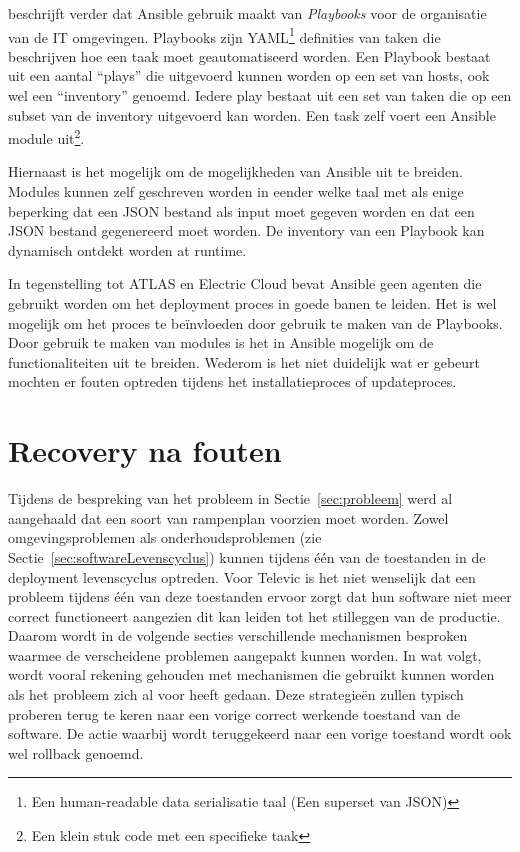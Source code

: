 \citep{ansible} beschrijft verder dat Ansible gebruik maakt van \emph{Playbooks} voor de organisatie van de IT omgevingen.
Playbooks zijn YAML\footnote{Een human-readable data serialisatie taal (Een superset van JSON)} definities van taken die beschrijven hoe een taak moet geautomatiseerd worden.
Een Playbook bestaat uit een aantal ``plays'' die uitgevoerd kunnen worden op een set van hosts, ook wel een ``inventory'' genoemd.
Iedere play bestaat uit een set van taken die op een subset van de inventory uitgevoerd kan worden.
Een task zelf voert een Ansible module uit\footnote{Een klein stuk code met een specifieke taak}.

Hiernaast is het mogelijk om de mogelijkheden van Ansible uit te breiden.
Modules kunnen zelf geschreven worden in eender welke taal met als enige beperking dat een JSON bestand als input moet gegeven worden en dat een JSON bestand gegenereerd moet worden.
De inventory van een Playbook kan dynamisch ontdekt worden at runtime.

In tegenstelling tot ATLAS en Electric Cloud bevat Ansible geen agenten die gebruikt worden om het deployment proces in goede banen te leiden.
Het is wel mogelijk om het proces te beïnvloeden door gebruik te maken van de Playbooks.
Door gebruik te maken van modules is het in Ansible mogelijk om de functionaliteiten uit te breiden.
Wederom is het niet duidelijk wat er gebeurt mochten er fouten optreden tijdens het installatieproces of updateproces.

\section{Recovery na fouten}\label{sec:rollback}
Tijdens de bespreking van het probleem in Sectie~\vref{sec:probleem} werd al aangehaald dat een soort van rampenplan voorzien moet worden.
Zowel omgevingsproblemen als onderhoudsproblemen (zie Sectie~\vref{sec:softwareLevenscyclus}) kunnen tijdens één van de toestanden in de deployment levenscyclus optreden.
Voor Televic is het niet wenselijk dat een probleem tijdens één van deze toestanden ervoor zorgt dat hun software niet meer correct functioneert aangezien dit kan leiden tot het stilleggen van de productie.
Daarom wordt in de volgende secties verschillende mechanismen besproken waarmee de verscheidene problemen aangepakt kunnen worden.
In wat volgt, wordt vooral rekening gehouden met mechanismen die gebruikt kunnen worden als het probleem zich al voor heeft gedaan.
Deze strategieën zullen typisch proberen terug te keren naar een vorige correct werkende toestand van de software.
De actie waarbij wordt teruggekeerd naar een vorige toestand wordt ook wel rollback genoemd.

